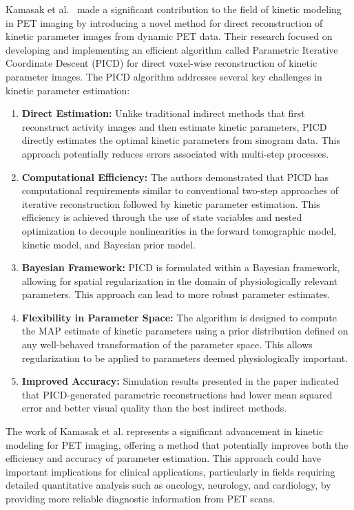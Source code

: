 Kamasak et al.~\cite{kamasak2005} made a significant contribution to the field of kinetic modeling in PET imaging by introducing a novel method for direct reconstruction of kinetic parameter images from dynamic PET data. Their research focused on developing and implementing an efficient algorithm called Parametric Iterative Coordinate Descent (PICD) for direct voxel-wise reconstruction of kinetic parameter images.
The PICD algorithm addresses several key challenges in kinetic parameter estimation:
\begin{enumerate}
\item \textbf{Direct Estimation:} Unlike traditional indirect methods that first reconstruct activity images and then estimate kinetic parameters, PICD directly estimates the optimal kinetic parameters from sinogram data. This approach potentially reduces errors associated with multi-step processes.
\item \textbf{Computational Efficiency:} The authors demonstrated that PICD has computational requirements similar to conventional two-step approaches of iterative reconstruction followed by kinetic parameter estimation. This efficiency is achieved through the use of state variables and nested optimization to decouple nonlinearities in the forward tomographic model, kinetic model, and Bayesian prior model.

\item \textbf{Bayesian Framework:} PICD is formulated within a Bayesian framework, allowing for spatial regularization in the domain of physiologically relevant parameters. This approach can lead to more robust parameter estimates.

\item \textbf{Flexibility in Parameter Space:} The algorithm is designed to compute the MAP estimate of kinetic parameters using a prior distribution defined on any well-behaved transformation of the parameter space. This allows regularization to be applied to parameters deemed physiologically important.

\item \textbf{Improved Accuracy:} Simulation results presented in the paper indicated that PICD-generated parametric reconstructions had lower mean squared error and better visual quality than the best indirect methods.
\end{enumerate}
The work of Kamasak et al. represents a significant advancement in kinetic modeling for PET imaging, offering a method that potentially improves both the efficiency and accuracy of parameter estimation. This approach could have important implications for clinical applications, particularly in fields requiring detailed quantitative analysis such as oncology, neurology, and cardiology, by providing more reliable diagnostic information from PET scans.





